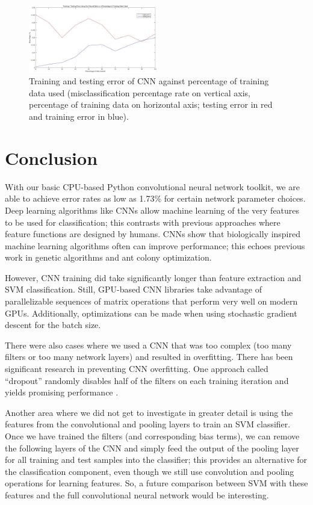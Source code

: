 \documentclass[10pt,twocolumn]{article}
\begin{document}
\begin{figure}
\includegraphics[width = 0.5\textwidth]{figure/neural_net_percentage_data}
\caption{Training and testing error of CNN against percentage of training data used (misclassification percentage rate on vertical axis, percentage of training data on horizontal axis; testing error in red and training error in blue).}
\label{fig:neural_net_percentage_data}
\end{figure}

\section{Conclusion} \label{sec:conclude}

With our basic CPU-based Python convolutional neural network toolkit, we are able to achieve error rates as low as 1.73\% for certain network parameter choices. Deep learning algorithms like CNNs allow machine learning of the very features to be used for classification; this contrasts with previous approaches where feature functions are designed by humans. CNNs show that biologically inspired machine learning algorithms often can improve performance; this echoes previous work in genetic algorithms and ant colony optimization.

However, CNN training did take significantly longer than feature extraction and SVM classification. Still, GPU-based CNN libraries take advantage of parallelizable sequences of matrix operations that perform very well on modern GPUs. Additionally, optimizations can be made when using stochastic gradient descent for the batch size.

There were also cases where we used a CNN that was too complex (too many filters or too many network layers) and resulted in overfitting. There has been significant research in preventing CNN overfitting. One approach called ``dropout'' randomly disables half of the filters on each training iteration and yields promising performance \cite{dropout}.

Another area where we did not get to investigate in greater detail is using the features from the convolutional and pooling layers to train an SVM classifier. Once we have trained the filters (and corresponding bias terms), we can remove the following layers of the CNN and simply feed the output of the pooling layer for all training and test samples into the classifier; this provides an alternative for the classification component, even though we still use convolution and pooling operations for learning features. So, a future comparison between SVM with these features and the full convolutional neural network would be interesting.
\end{document}
